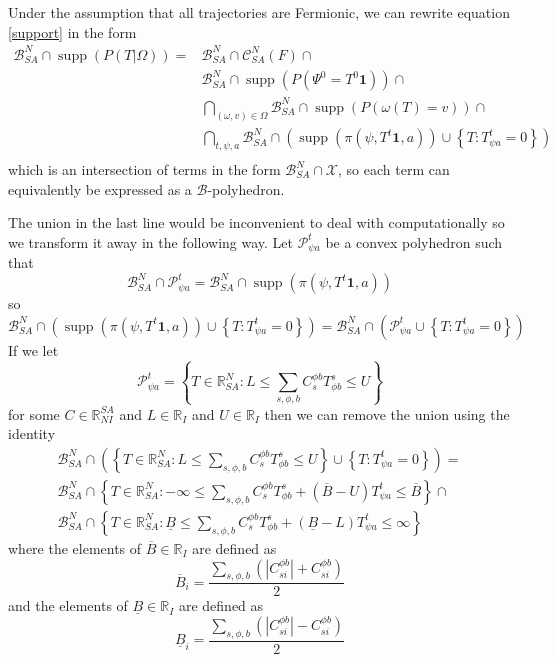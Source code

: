 \documentclass{article}
\DeclareMathOperator\supp{supp}
\begin{document}
Under the assumption that all trajectories are Fermionic, we can rewrite equation \ref{support} in the form
\begin{equation}
\begin{aligned}
\mathcal{B}^N_{SA} \cap \supp (P( T |\Omega)) = 
& \mathcal{B}^N_{SA} \cap \mathcal{C}^N_{SA}(F) \cap \\
& \mathcal{B}^N_{SA} \cap  \supp(P(\Psi^0 = T^0\mathbf{1})) \cap\\
& \bigcap_{(\omega,v) \in \Omega}   \mathcal{B}^N_{SA} \cap \supp\left(P\left(\omega(T)=v\right)\right) \cap \\
& \bigcap_{t,\psi, a}
\mathcal{B}^N_{SA} \cap \left(\supp\left(\pi(\psi,T^t\mathbf{1},a)\right)
\cup
\left\{T: T^t_{\psi a} = 0\right\}\right)
\\
\end{aligned}
\label{fermionicSupport}
\end{equation}
which is an intersection of terms in the form $\mathcal{B}^N_{SA} \cap \mathcal{X}$, so each term can equivalently be expressed as a $\mathcal{B}$-polyhedron.

The union in the last line would be inconvenient to deal with computationally so we transform it away in the following way. Let $\mathcal{P}^t_{\psi a}$ be a convex polyhedron such that
\[
\mathcal{B}^N_{SA} \cap \mathcal{P}^t_{\psi a} = \mathcal{B}^N_{SA} \cap \supp\left(\pi(\psi,T^t\mathbf{1},a)\right)
\]
so
\[
\mathcal{B}^N_{SA} \cap \left(\supp\left(\pi(\psi,T^t\mathbf{1},a)\right) \cup
\left\{T: T^t_{\psi a} = 0\right\}\right)
=
\mathcal{B}^N_{SA} \cap \left(\mathcal{P}^t_{\psi a} \cup \left\{T: T^t_{\psi a} = 0\right\}\right)
\]
If we let
\[
\mathcal{P}^t_{\psi a} = \left\{ T\in\mathbb{R}^N_{SA} : L \le \sum_{s,\phi,b} C^{\phi b}_{s} T^s_{\phi b} \le U \right\}
\]
for some $C \in \mathbb{R}^{SA}_{NI}$ and $L\in\mathbb{R}_I$ and $U\in\mathbb{R}_I$ then we can remove the union using the identity
\begin{multline}
\mathcal{B}^N_{SA} \cap
\left(
\left\{ T\in\mathbb{R}^N_{SA} : L \le \sum_{s,\phi,b} C^{\phi b}_{s} T^s_{\phi b} \le U \right\}
\cup
\left\{T: T^t_{\psi a} = 0\right\}\right)
=\\
\mathcal{B}^N_{SA} \cap
\left\{
T\in\mathbb{R}^N_{SA}:
-\infty \le \sum_{s,\phi,b} C^{\phi b}_{s} T^s_{\phi b}
+
(\overline{B}-U)T^{t}_{\psi a}
\le \overline{B}
\right\}
\cap\\
\mathcal{B}^N_{SA} \cap
\left\{
T\in\mathbb{R}^N_{SA}:
\underline{B} \le \sum_{s,\phi,b} C^{\phi b}_{s} T^s_{\phi b}
+
(\underline{B}-L)T^{t}_{\psi a} \le \infty
\right\}
\label{implication}
\end{multline}
where the elements of $\overline{B}\in\mathbb{R}_I$ are defined as
\[
\overline{B}_i = \frac{\sum_{s,\phi,b} \left( |C^{\phi b}_{si}| + C^{\phi b}_{si}\right)}{2}
\]
and the elements of $\underline{B}\in\mathbb{R}_I$ are defined as
\[
\underline{B}_i = \frac{\sum_{s,\phi,b} \left( |C^{\phi b}_{si}| - C^{\phi b}_{si}\right)}{2}
\]
\end{document}
